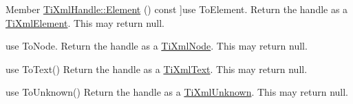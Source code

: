 \begin{DoxyRefList}
Member \hyperlink{class_ti_xml_handle_acb5fe8388a526289ea65e817a51e05e7}{Ti\-Xml\-Handle\-:\-:Element} () const ]use To\-Element. Return the handle as a \hyperlink{class_ti_xml_element}{Ti\-Xml\-Element}. This may return null.  
\item[\label{deprecated__deprecated000001}%
\hypertarget{deprecated__deprecated000001}{}%
Member \hyperlink{class_ti_xml_handle_ab44b723a8dc9af72838a303c079d0376}{Ti\-Xml\-Handle\-:\-:Node} () const ]use To\-Node. Return the handle as a \hyperlink{class_ti_xml_node}{Ti\-Xml\-Node}. This may return null.  
\item[\label{deprecated__deprecated000003}%
\hypertarget{deprecated__deprecated000003}{}%
Member \hyperlink{class_ti_xml_handle_a9fc739c8a18d160006f82572fc143d13}{Ti\-Xml\-Handle\-:\-:Text} () const ]use To\-Text() Return the handle as a \hyperlink{class_ti_xml_text}{Ti\-Xml\-Text}. This may return null.  
\item[\label{deprecated__deprecated000004}%
\hypertarget{deprecated__deprecated000004}{}%
Member \hyperlink{class_ti_xml_handle_a49675b74357ba2aae124657a9a1ef465}{Ti\-Xml\-Handle\-:\-:Unknown} () const ]use To\-Unknown() Return the handle as a \hyperlink{class_ti_xml_unknown}{Ti\-Xml\-Unknown}. This may return null. 
\end{DoxyRefList}